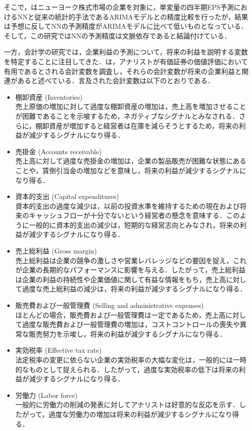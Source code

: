 \documentclass[a4paper，12pt]{jsarticle}
\begin{document}
そこで，\cite{callen1996neural}はニューヨーク株式市場の企業を対象に，単変量の四半期EPS予測におけるNNと従来の統計的手法であるARIMAモデルとの精度比較を行ったが，結果は予想に反してNNの予測精度がARIMAモデルに比べて低いものとなっている．そして，この研究ではNNの予測精度は文脈依存であると結論付けている．

一方，会計学の研究では，企業利益の予測について，将来の利益を説明する変数を特定することに注目してきた．\cite*{lev1993fundamental}は，アナリストが有価証券の価値評価において有用であるとされる会計変数を調査し，それらの会計変数が将来の企業利益と関連があると述べている．言及された会計変数は以下のとおりである．

\begin{itemize}
\item 棚卸資産 (Inventories) \\
    売上原価の増加に対して過度な棚卸資産の増加は，売上高を増加させることが困難であることを示唆するため，ネガティブなシグナルとみなされる．さらに，棚卸資産が増加すると経営者は在庫を減らそうとするため，将来の利益が減少するシグナルになり得る．

\item 売掛金 (Accounts receivable) \\
    売上高に対して過度な売掛金の増加は，企業の製品販売が困難な状態にあることや，賃倒引当金の増加などを意味し，将来の利益が減少するシグナルになり得る．

\item 資本的支出 (Capital expenditures) \\
    資本的支出の過度な減少は，以前の投資水準を維持するための現在および将来のキャッシュフローが十分でないという経営者の懸念を意味する．このように一般的に資本的支出の減少は，短期的な経営志向とみなされ，将来の利益が減少するシグナルになり得る．

\item 売上総利益 (Gross margin) \\
    売上総利益は企業の競争の激しさや営業レバレッジなどの要因を捉え，これが企業の長期的なパフォーマンスに影響を与える．したがって，売上総利益は企業の利益の持続性や企業価値に関して有益な情報をもち，売上高に対して過度な売上総利益の減少は，将来の利益が減少するシグナルになり得る．

\item 販売費および一般管理費 (Selling and administrative expenses) \\
    ほとんどの場合，販売費および一般管理費は一定であるため，売上高に対して過度な販売費および一般管理費の増加は，コストコントロールの喪失や異常な販売努力を示唆し，将来の利益が減少するシグナルになり得る．

\item 実効税率 (Effective tax rate) \\
    法定税率の変更に依らない企業の実効税率の大幅な変化は，一般的には一時的なものとして捉えられる．したがって，過度な実効税率の低下は将来の利益が減少するシグナルになり得る．

\item 労働力 (Labor force) \\
    一般的に労働力の削減の発表に対してアナリストは好意的な反応を示す．したがって，過度な労働力の増加は将来の利益が減少するシグナルになり得る．
\end{itemize}
\end{document}
